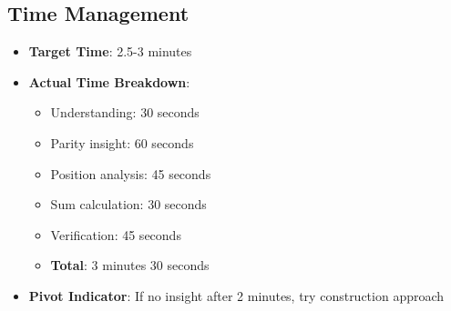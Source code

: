 \documentclass[11pt]{article}
\begin{document}
\begin{roadmapbox}
\subsection*{Time Management}
\begin{itemize}[leftmargin=*]
    \item \textbf{Target Time}: 2.5-3 minutes
    \item \textbf{Actual Time Breakdown}:
    \begin{itemize}
        \item Understanding: 30 seconds
        \item Parity insight: 60 seconds
        \item Position analysis: 45 seconds
        \item Sum calculation: 30 seconds
        \item Verification: 45 seconds
        \item \textbf{Total}: 3 minutes 30 seconds
    \end{itemize}
    \item \textbf{Pivot Indicator}: If no insight after 2 minutes, try construction approach
\end{itemize}
\end{roadmapbox}
\end{document}
